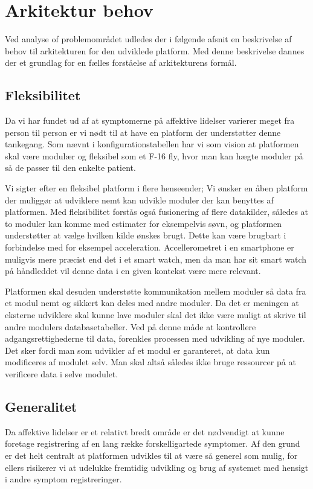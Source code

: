 \section{Arkitektur behov}\label{arkitekturkrav}
Ved analyse of problemområdet udledes der i følgende afsnit en beskrivelse af behov til arkitekturen for den udviklede platform.
Med denne beskrivelse dannes der et grundlag for en fælles forståelse af arkitekturens formål.

\subsection{Fleksibilitet}
Da vi har fundet ud af at symptomerne på affektive lidelser varierer meget fra person til person er vi nødt til at have en platform der understøtter denne tankegang.
Som nævnt i konfigurationstabellen har vi som vision at platformen skal være modulær og fleksibel som et F-16 fly, hvor man kan hægte moduler på så de passer til den enkelte patient.

Vi sigter efter en fleksibel platform i flere henseender;
Vi ønsker en åben platform der muliggør at udviklere nemt kan udvikle moduler der kan benyttes af platformen.
Med fleksibilitet forstås også fusionering af flere datakilder, således at to moduler kan komme med estimater for eksempelvis søvn, og platformen understøtter at vælge hvilken kilde ønskes brugt.
Dette kan være brugbart i forbindelse med for eksempel acceleration.
Accellerometret i en smartphone er muligvis mere præcist end det i et smart watch, men da man har sit smart watch på håndleddet vil denne data i en given kontekst være mere relevant.

Platformen skal desuden understøtte kommunikation mellem moduler så data fra et modul nemt og sikkert kan deles med andre moduler.
Da det er meningen at eksterne udviklere skal kunne lave moduler skal det ikke være muligt at skrive til andre modulers databasetabeller.
Ved på denne måde at kontrollere adgangsrettighederne til data, forenkles processen med udvikling af nye moduler.
Det sker fordi man som udvikler af et modul er garanteret, at data kun modificeres af modulet selv.
Man skal altså således ikke bruge ressourcer på at verificere data i selve modulet.

\subsection{Generalitet}
Da affektive lidelser er et relativt bredt område er det nødvendigt at kunne foretage registrering af en lang række forskelligartede symptomer.
Af den grund er det helt centralt at platformen udvikles til at være så generel som mulig, for ellers risikerer vi at udelukke fremtidig udvikling og brug af systemet med hensigt i andre symptom registreringer.
